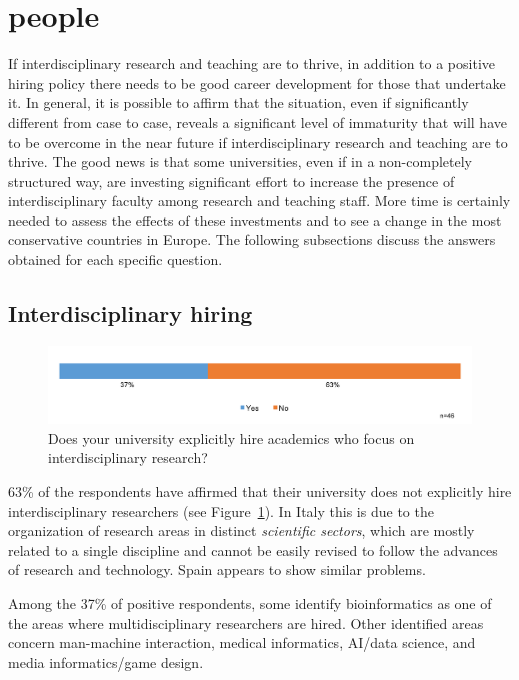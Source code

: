 \section{people}

If interdisciplinary research and teaching are to thrive, in addition to a positive hiring policy there needs to be good career development for those that undertake it.
 In general, it is possible to affirm that the situation,
even if significantly different from case to case, reveals a
significant level of immaturity that will have to be overcome in the
near future if interdisciplinary research and teaching are to thrive. The good news is that some universities, even if in
a non-completely structured way, are investing significant effort to
increase the presence of interdisciplinary faculty among research and
teaching staff. More time is certainly needed to assess the
effects of these investments and to see a change in the most
conservative countries in Europe. The 
following subsections discuss the answers obtained for each specific
question.

\subsection{Interdisciplinary hiring}\label{sec:hiring}

\begin{figure}[h]
\centering
\includegraphics[width = \linewidth]{charts/3a.png}
\caption{Does your university explicitly hire academics
  who focus on interdisciplinary research?}
\label{sect3:hirings}
\end{figure}

63\% of the respondents have affirmed that their university does not
explicitly hire interdisciplinary researchers (see Figure~\ref{sect3:hirings}). In Italy this is 
due to the organization of research areas in distinct \emph{scientific
  sectors}, which are mostly related to a single discipline and cannot be easily revised to follow the advances of
research and technology. Spain appears to show similar problems.

Among the 37\% of positive respondents, some identify bioinformatics
as one of the areas where multidisciplinary researchers are hired. 
Other identified areas concern man-machine interaction, medical
informatics, AI/data science, and media informatics/game design.

